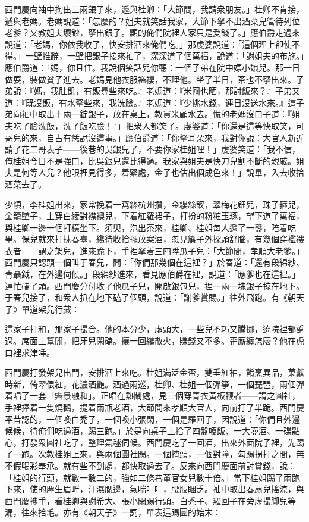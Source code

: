 西門慶向袖中掏出三兩銀子來，遞與桂卿：「大節間，我請衆朋友。」桂卿不肯接，遞與老媽。老媽說道：「怎麼的？姐夫就笑話我家，大節下拏不出酒菜兒管待列位老爹？又教姐夫壞鈔，拏出銀子。顯的俺們院裡人家只是愛錢了。」應伯爵走過來說道：「老媽，你依我收了，快安排酒來俺們吃。」那虔婆說道：「這個理上卻使不得。」一壁推辭，一壁把銀子接來袖了，深深道了個萬福，說道：「謝姐夫的布施。」{}應伯爵道：「媽，你且住。我說個笑話兒你聽：{}一個子弟在院中嫖小娘兒。那一日做耍，裝做貧子進去。老媽見他衣服襤褸，不理他。坐了半日，茶也不拏出來。子弟說：『媽，我肚飢，有飯尋些來吃。』老媽道：『米囤也晒，那討飯來？』子弟又道：『既沒飯，有水拏些來，我洗臉。』老媽道：『少挑水錢，連日沒送水來。』這子弟向袖中取出十兩一錠銀子，放在桌上，教買米顧水去。慌的老媽沒口子道：『姐夫吃了臉洗飯，洗了飯吃臉！』」把衆人都笑了。虔婆道：「你還是這等快取笑，可哥兒的來，自古有恁說沒這事。」{}應伯爵道：「你拏耳朵來，我對你說：大官人新近請了花二哥表子——{}後巷的吳銀兒了，不要你家桂姐哩！」虔婆笑道：「我不信，俺桂姐今日不是強口，比吳銀兒還比得過。我家與姐夫是快刀兒割不斷的親戚。{}姐夫是何等人兒？他眼裡見得多，着緊處，金子也估出個成色來！」說畢，入去收拾酒菜去了。

少頃，李桂姐出來，家常挽着一窩絲杭州攢，金縷絲釵，翠梅花鈿兒，珠子箍兒，金籠墜子，上穿白綾對襟襖兒，下着紅羅裙子，打扮的粉粧玉琢，望下道了萬福，與桂卿一邊一個打橫坐下。須臾，泡出茶來，桂卿、桂姐每人遞了一盞，陪着吃畢。保兒就來打抹春臺，纔待收拾擺放案酒，忽見簾子外探頭舒腦，有幾個穿襤褸衣者——謂之架兒，{}進來跪下，手裡拏着三四陞瓜子兒：「大節間，孝順大老爹。」西門慶只認頭一個叫于春兒，問：「你們那幾個在這裡？」於春道：「還有段綿紗、青聶鉞，在外邊伺候。」段綿紗進來，看見應伯爵在裡，說道：「應爹也在這裡。」連忙磕了頭。西門慶分付收了他瓜子兒，開啟銀包兒，捏一兩一塊銀子掠在地下。于春兒接了，和衆人扒在地下磕了個頭，說道：「謝爹賞賜。」往外飛跑。有《朝天子》單道架兒行藏：

\begin{myquote}
這家子打和，那家子撮合。他的本分少，虛頭大，一些兒不巧又騰挪，遶院裡都踅過。席面上幫閒，把牙兒閑磕。攘一回纔散火，{}賺錢又不多。歪厮纏怎麼？他在虎口裡求津唾。
\end{myquote}

西門慶打發架兒出門，安排酒上來吃。桂姐滿泛金盃，雙垂紅袖，餚烹異品，菓獻時新，倚翠偎紅，花濃酒艷。酒過兩巡，桂卿、桂姐一個彈箏，一個琵琶，兩個彈着唱了一套「霽景融和」。正唱在熱鬧處，見三個穿青衣黃板鞭者——謂之圓社，手裡捧着一隻燒鵝，提着兩瓶老酒，大節間來孝順大官人，向前打了半跪。西門慶平昔認的，一個喚白禿子，一個喚小張閑，一個是羅回子，{}因說道：「你們且外邊候候，待俺們吃過酒，踢三跑。」於是向桌子上拾了四盤嗄飯、一大壺酒、一碟點心，打發衆圓社吃了，整理氣毬伺候。西門慶吃了一回酒，出來外面院子裡，先踢了一跑。次教桂姐上來，與兩個圓社踢。一個揸頭，一個對障，勾踢拐打之間，無不假喝彩奉承。就有些不到處，都快取過去了。反來向西門慶面前討賞錢，說：「桂姐的行頭，就數一數二的，強如二條巷董官女兒數十倍。」當下桂姐踢了兩跑下來，使的塵生眉畔，汗濕腮邊，氣喘吁吁，腰肢睏乏。袖中取出春扇兒搖涼，與西門慶攜手，看桂卿與謝希大、張小閑踢行頭。白禿子、羅回子在旁虛撮脚兒等漏，往來拾毛。亦有《朝天子》一詞，單表這踢圓的始末：

